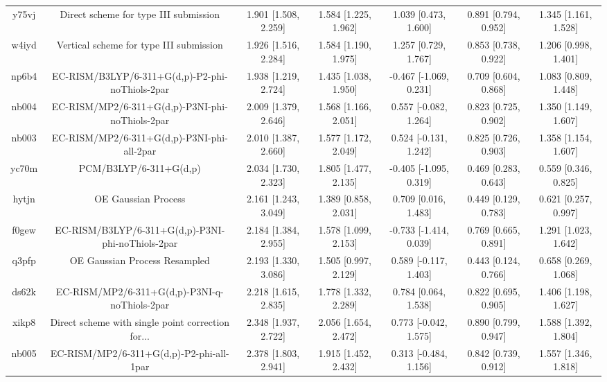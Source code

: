 \documentclass{article}
\begin{document}
\begin{center}
\begin{longtable}{|ccccccc|}
 y75vj &              Direct scheme for type III submission &  1.901 [1.508, 2.259] &  1.584 [1.225, 1.962] &     1.039 [0.473, 1.600] &  0.891 [0.794, 0.952] &   1.345 [1.161, 1.528] \\
 w4iyd &            Vertical scheme for type III submission &  1.926 [1.516, 2.284] &  1.584 [1.190, 1.975] &     1.257 [0.729, 1.767] &  0.853 [0.738, 0.922] &   1.206 [0.998, 1.401] \\
 np6b4 &    EC-RISM/B3LYP/6-311+G(d,p)-P2-phi-noThiols-2par &  1.938 [1.219, 2.724] &  1.435 [1.038, 1.950] &   -0.467 [-1.069, 0.231] &  0.709 [0.604, 0.868] &   1.083 [0.809, 1.448] \\
 nb004 &    EC-RISM/MP2/6-311+G(d,p)-P3NI-phi-noThiols-2par &  2.009 [1.379, 2.646] &  1.568 [1.166, 2.051] &    0.557 [-0.082, 1.264] &  0.823 [0.725, 0.902] &   1.350 [1.149, 1.607] \\
 nb003 &         EC-RISM/MP2/6-311+G(d,p)-P3NI-phi-all-2par &  2.010 [1.387, 2.660] &  1.577 [1.172, 2.049] &    0.524 [-0.131, 1.242] &  0.825 [0.726, 0.903] &   1.358 [1.154, 1.607] \\
 yc70m &                             PCM/B3LYP/6-311+G(d,p) &  2.034 [1.730, 2.323] &  1.805 [1.477, 2.135] &   -0.405 [-1.095, 0.319] &  0.469 [0.283, 0.643] &   0.559 [0.346, 0.825] \\
 hytjn &                                OE Gaussian Process &  2.161 [1.243, 3.049] &  1.389 [0.858, 2.031] &     0.709 [0.016, 1.483] &  0.449 [0.129, 0.783] &   0.621 [0.257, 0.997] \\
 f0gew &  EC-RISM/B3LYP/6-311+G(d,p)-P3NI-phi-noThiols-2par &  2.184 [1.384, 2.955] &  1.578 [1.099, 2.153] &   -0.733 [-1.414, 0.039] &  0.769 [0.665, 0.891] &   1.291 [1.023, 1.642] \\
 q3pfp &                      OE Gaussian Process Resampled &  2.193 [1.330, 3.086] &  1.505 [0.997, 2.129] &    0.589 [-0.117, 1.403] &  0.443 [0.124, 0.766] &   0.658 [0.269, 1.068] \\
 ds62k &      EC-RISM/MP2/6-311+G(d,p)-P3NI-q-noThiols-2par &  2.218 [1.615, 2.835] &  1.778 [1.332, 2.289] &     0.784 [0.064, 1.538] &  0.822 [0.695, 0.905] &   1.406 [1.198, 1.627] \\
 xikp8 &  Direct scheme with single point correction for... &  2.348 [1.937, 2.722] &  2.056 [1.654, 2.472] &    0.773 [-0.042, 1.575] &  0.890 [0.799, 0.947] &   1.588 [1.392, 1.804] \\
 nb005 &           EC-RISM/MP2/6-311+G(d,p)-P2-phi-all-1par &  2.378 [1.803, 2.941] &  1.915 [1.452, 2.432] &    0.313 [-0.484, 1.156] &  0.842 [0.739, 0.912] &   1.557 [1.346, 1.818] \\

\end{longtable}
\end{center}
\end{document}

